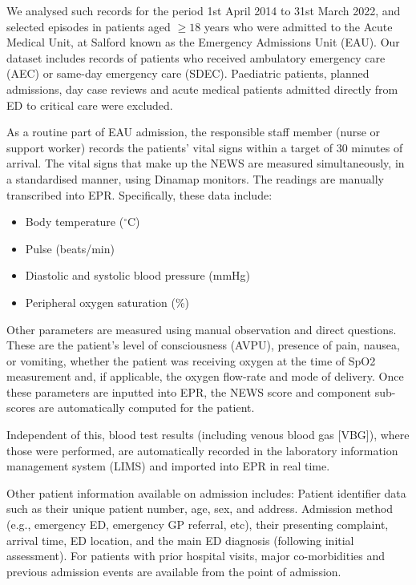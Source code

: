 \documentclass[10pt,journal, compsoc]{IEEEtran}
\begin{document}
We analysed such records for the period 1st April 2014 to 31st March 2022, and selected episodes in patients aged $\geq 18$ years who were admitted to the Acute Medical Unit, at Salford known as the Emergency Admissions Unit (EAU). Our dataset includes records of patients who received ambulatory emergency care (AEC) or same-day emergency care (SDEC). Paediatric patients, planned admissions, day case reviews and acute medical patients admitted directly from ED to critical care were excluded.

As a routine part of EAU admission, the responsible staff member (nurse or support worker) records the patients' vital signs within a target of 30 minutes of arrival. The vital signs that make up the NEWS are measured simultaneously, in a standardised manner, using Dinamap monitors. The readings are manually transcribed into EPR. Specifically, these data include:

\begin{itemize}
    \item Body temperature ($^{\circ}$C)
    \item Pulse (beats/min)
    \item Diastolic and systolic blood pressure (mmHg)
    \item Peripheral oxygen saturation (\%)
\end{itemize}
Other parameters are measured using manual observation and direct questions. These are the patient's level of consciousness (AVPU), presence of pain, nausea, or vomiting, whether the patient was receiving oxygen at the time of SpO2 measurement and, if applicable, the oxygen flow-rate and mode of delivery. Once these parameters are inputted into EPR, the NEWS score and component sub-scores are automatically computed for the patient.

Independent of this, blood test results (including venous blood gas [VBG]), where those were performed, are automatically recorded in the laboratory information management system (LIMS) and imported into EPR in real time.

Other patient information available on admission includes: Patient identifier data such as their unique patient number, age, sex, and address. Admission method (e.g., emergency ED, emergency GP referral, etc), their presenting complaint, arrival time, ED location, and the main ED diagnosis (following initial assessment). For patients with prior hospital visits, major co-morbidities and previous admission events are available from the point of admission.
\end{document}
